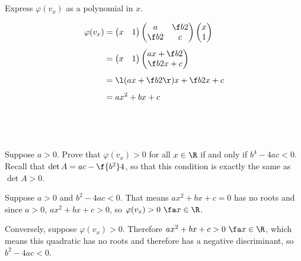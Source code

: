 \documentclass[a4paper]{article}
\begin{document}
\subsection{~} %

\begin{questionbody}
Express $\varphi(v_x)$ as a polynomial in $x$.
\end{questionbody}

\begin{align*}
\varphi(v_x) &= \begin{pmatrix}x & 1\end{pmatrix} \begin{pmatrix}a & \f b2 \\ \f b2 & c\end{pmatrix} \begin{pmatrix}x \\ 1\end{pmatrix} \\[1ex]
&= \begin{pmatrix}x & 1\end{pmatrix} \begin{pmatrix}ax + \f b2 \\ \f b2 x + c\end{pmatrix} \\[1ex]
&= \l(ax + \f b2\r)x + \f b2 x + c \\[1ex]
&= ax^2 + bx + c
\end{align*}

\clearpage
\subsection{~} %

\begin{questionbody}
Suppose $a > 0$. Prove that $\varphi(v_x) > 0$ for all $x \in \R$ if and only if $b^4 - 4ac < 0$. Recall that $\det A = ac - \f{b^2}4$, so that this condition is exactly the same as $\det A > 0$.
\end{questionbody}

Suppose $a > 0$ and $b^2 - 4ac < 0$. That means $ax^2 + bx + c = 0$ has no roots and since $a > 0$, $ax^2 + bx + c > 0$, so $\varphi(v_x) > 0\ \fa x \in \R$.

Conversely, suppose $\varphi(v_x) > 0$. Therefore $ax^2 + bx + c > 0\ \fa x \in \R$, which means this quadratic has no roots and therefore has a negative discriminant, so $b^2 - 4ac < 0$.


\end{document}
